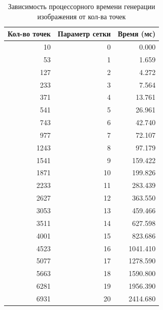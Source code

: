         \begin{table}[h!]
            \caption{Зависимость процессорного времени генерации изображения от кол-ва точек}
            \centering
            \begin{tabular}{|r|r|r|}
            \hline
            Кол-во точек & Параметр сетки & Время (мс)  \\\hline
            10 & 0 & 0.000 \\ \hline
            53 & 1 & 1.659 \\ \hline
            127 & 2 & 4.272 \\ \hline
            233 & 3 & 7.564 \\ \hline
            371 & 4 & 13.761 \\ \hline
            541 & 5 & 26.961 \\ \hline
            743 & 6 & 42.740 \\ \hline
            977 & 7 & 72.107 \\ \hline
            1243 & 8 & 97.179 \\ \hline
            1541 & 9 & 159.422 \\ \hline
            1871 & 10 & 199.826 \\ \hline
            2233 & 11 & 283.439 \\ \hline
            2627 & 12 & 363.550 \\ \hline
            3053 & 13 & 459.466 \\ \hline
            3511 & 14 & 627.598 \\ \hline
            4001 & 15 & 823.686 \\ \hline
            4523 & 16 & 1041.410 \\ \hline{}
            5077 & 17 & 1278.590 \\ \hline
            5663 & 18 & 1590.800 \\ \hline
            6281 & 19 & 1956.390 \\ \hline
            6931 & 20 & 2414.680 \\ \hline
            \end{tabular}
            \label{table:gen}
        \end{table}

